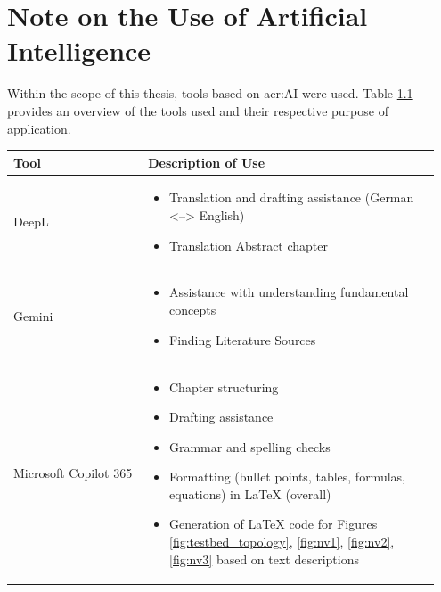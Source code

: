 \chapter{Note on the Use of Artificial Intelligence}

Within the scope of this thesis, tools based on \gls{acr:AI} were used. Table \ref{tab:anhang_uebersicht_KI_werkzeuge} provides an overview of the tools used and their respective purpose of application.

\begin{table}[hbt]	
	\centering
	\renewcommand{\arraystretch}{1.5}	%
	\label{tab:anhang_uebersicht_KI_werkzeuge}
	\begin{tabular}{>{\raggedright\arraybackslash}p{0.3\linewidth} >{\raggedright\arraybackslash}p{0.65\linewidth}}
		\textbf{Tool} & \textbf{Description of Use}\\
		\hline 
		\hline
		DeepL	&	\vspace{-\topsep}
		\begin{itemize}[noitemsep,topsep=0pt,partopsep=0pt,parsep=0pt] 
			\item Translation and drafting assistance (German <--> English)
			\item Translation Abstract chapter
		\end{itemize} \\ 
		Gemini	&	\vspace{-\topsep}
		\begin{itemize}[noitemsep,topsep=0pt,partopsep=0pt,parsep=0pt] 
			\item Assistance with understanding fundamental concepts
			\item Finding Literature Sources
		\end{itemize} \\ 
		Microsoft Copilot 365	&	\vspace{-\topsep}
		\begin{itemize}[noitemsep,topsep=0pt,partopsep=0pt,parsep=0pt] 
			\item Chapter structuring
			\item Drafting assistance
			\item Grammar and spelling checks
			\item Formatting (bullet points, tables, formulas, equations) in LaTeX (overall)
			\item Generation of LaTeX code for Figures \ref{fig:testbed_topology}, \ref{fig:nv1},  \ref{fig:nv2}, \ref{fig:nv3} based on text descriptions

\end{itemize}
\end{tabular}
\end{table}
